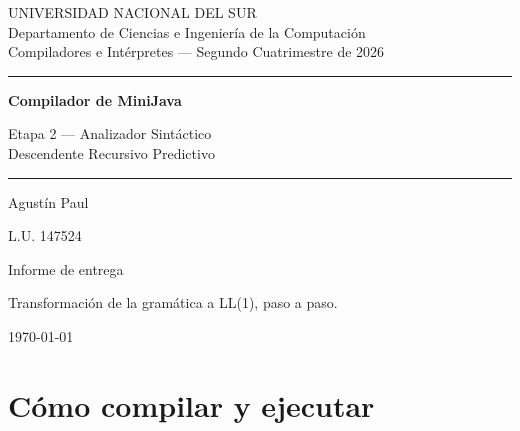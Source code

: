 \documentclass[12pt,a4paper]{article}
\begin{document}
\begin{titlepage}
\thispagestyle{empty}
\raggedright
\vspace*{2.2cm}

{\footnotesize\sffamily
UNIVERSIDAD NACIONAL DEL SUR\\
Departamento de Ciencias e Ingeniería de la Computación\\
Compiladores e Intérpretes --- Segundo Cuatrimestre de 2026\par}

\vspace{2.4cm}
{\rule{\textwidth}{0.6pt}}
\vspace{1.1cm}

{\Huge\bfseries Compilador de MiniJava\par}
\vspace{0.5cm}
{\LARGE\color{tinta} Etapa 2 --- Analizador Sintáctico\\[0.25cm]
\large Descendente Recursivo Predictivo\par}

\vspace{1.1cm}
{\rule{\textwidth}{0.6pt}}

\vspace{2.6cm}
{\large Agustín Paul\par}
\vspace{0.2cm}
{\normalsize L.U. 147524\par}
\vspace{0.4cm}
{Informe de entrega\par}

\vfill
{\color{tinta}\footnotesize
Transformación de la gramática a LL(1), paso a paso.\par}
\vspace{0.6cm}
{\color{tinta}\footnotesize \today\par}
\end{titlepage}

\thispagestyle{empty}
\tableofcontents
\newpage
\setcounter{page}{1}
\RaggedRight

\section{Cómo compilar y ejecutar}
\label{sec:uso}
\end{document}
